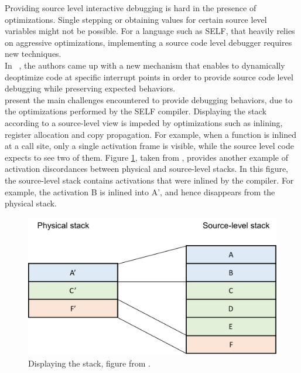 Providing source level interactive debugging is hard in the presence of optimizations.
Single stepping or obtaining values for certain source level variables might not be possible.
For a language such as SELF, that heavily relies on aggressive optimizations, implementing a source code level debugger requires new techniques.\\

In ~\cite{holzle1992debugging}, the authors came up with a new mechanism that enables to dynamically deoptimize code at specific interrupt points in order to provide source code level debugging while preserving expected behaviors.\\

 present the main challenges encountered to provide debugging behaviors, due to the optimizations performed by the SELF compiler. 
Displaying the stack according to a source-level view is impeded by optimizations such as inlining, register allocation and copy propagation.
For example, when a function is inlined at a call site, only a single activation frame is visible, while the source level code expects to see two of them.
Figure \ref{stackframes}, taken from \cite{holzle1992debugging}, provides another example of activation discordances between physical and source-level stacks.
In this figure, the source-level stack contains activations that were inlined by the compiler. For example, the activation B is inlined into A', and hence disappears from the physical stack.\\
\begin{figure}[h]
\centering
\includegraphics[scale=0.5]{Figures/Figure1.pdf}
\decoRule
\caption[physical vs. source-level stacks]{Displaying the stack, figure from \cite{holzle1992debugging}.}
\label{stackframes}
\end{figure}

